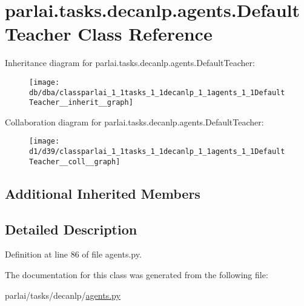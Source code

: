 \hypertarget{classparlai_1_1tasks_1_1decanlp_1_1agents_1_1DefaultTeacher}{}\section{parlai.\+tasks.\+decanlp.\+agents.\+Default\+Teacher Class Reference}
\label{classparlai_1_1tasks_1_1decanlp_1_1agents_1_1DefaultTeacher}


Inheritance diagram for parlai.\+tasks.\+decanlp.\+agents.\+Default\+Teacher\+:
\nopagebreak
\begin{figure}[H]
\begin{center}
\leavevmode
\texttt{[image: db/dba/classparlai\_1\_1tasks\_1\_1decanlp\_1\_1agents\_1\_1DefaultTeacher\_\_inherit\_\_graph]}
\end{center}
\end{figure}


Collaboration diagram for parlai.\+tasks.\+decanlp.\+agents.\+Default\+Teacher\+:
\nopagebreak
\begin{figure}[H]
\begin{center}
\leavevmode
\texttt{[image: d1/d39/classparlai\_1\_1tasks\_1\_1decanlp\_1\_1agents\_1\_1DefaultTeacher\_\_coll\_\_graph]}
\end{center}
\end{figure}
\subsection*{Additional Inherited Members}


\subsection{Detailed Description}


Definition at line 86 of file agents.\+py.



The documentation for this class was generated from the following file\+:\begin{DoxyCompactItemize}
\item 
parlai/tasks/decanlp/\hyperlink{parlai_2tasks_2decanlp_2agents_8py}{agents.\+py}\end{DoxyCompactItemize}
